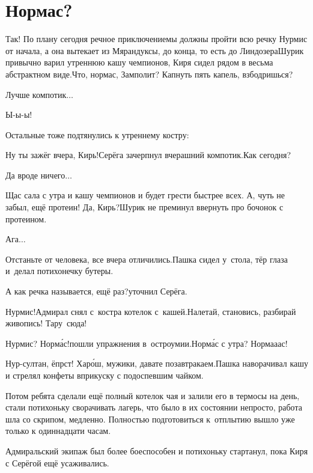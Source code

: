 \chapter{Нормас?}
\vepsianrose

\diagdash Так! По плану сегодня речное приключение\mdash мы должны пройти всю речку Нурмис от начала, а она вытекает из Мярандуксы, до конца, то есть до Линдозера\mdash Шурик привычно варил утреннюю кашу чемпионов, Киря сидел рядом в весьма абстрактном виде.\mdash Что, нормас, Замполит? Капнуть пять капель, взбодришься?

\diagdash Лучше компотик$\ldots$

\diagdash Ы-ы-ы!%

Остальные тоже подтянулись к утреннему костру:

\diagdash Ну ты зажёг вчера, Кирь!\mdash Серёга зачерпнул вчерашний компотик.\mdash Как сегодня?

\diagdash Да вроде ничего$\ldots$

\diagdash Щас сала с утра и кашу чемпионов и будет грести быстрее всех. А, чуть не забыл, ещё протеин! Да, Кирь?\mdash Шурик не преминул ввернуть про бочонок с протеином.

\diagdash Ага$\ldots$

\diagdash Отстаньте от человека, все вчера отличились.\mdash Пашка сидел у~стола, тёр глаза и~делал потихонечку бутеры.

\diagdash А как речка называется, ещё раз?\mdash уточнил Серёга.

\diagdash Нурмис!\mdash Адмирал снял с~костра котелок с~кашей.\mdash Налетай, становись, разбирай живопись! Тару~сюда!

\diagdash Нурмис? Норм{\'а}с!\mdash пошли упражнения в~остроумии.\mdash Норм{\'а}с с утра?  Норма\sdash а\sdash ас!

\diagdash Нур-султан, ёпрст! Хар{\'о}ш, мужики, давате позавтракаем.\mdash Пашка наворачивал кашу и стрелял конфеты вприкуску с подоспевшим чайком.

Потом ребята сделали ещё полный котелок чая и залили его в термосы на день, стали потихоньку сворачивать лагерь, что было в их состоянии непросто, работа шла со скрипом, медленно. Полностью подготовиться к~отплытию вышло уже только к одиннадцати часам.

Адмиральский экипаж был более боеспособен и потихоньку стартанул, пока Киря с Серёгой ещё усаживались. 

